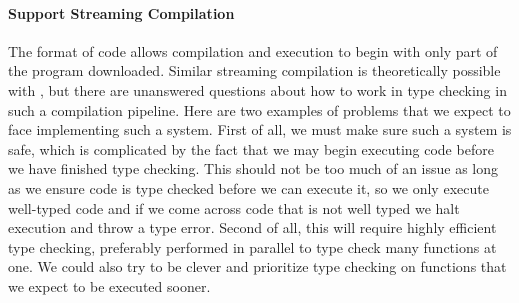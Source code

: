 \paragraph{Support Streaming Compilation}
The format of \wasm code allows compilation and execution to begin with only part of the program downloaded.
Similar streaming compilation is theoretically possible with \name, but there are unanswered questions about how to work in type checking in such a compilation pipeline.
Here are two examples of problems that we expect to face implementing such a system.
First of all, we must make sure such a system is safe, which is complicated by the fact that we may begin executing code before we have finished type checking.
This should not be too much of an issue as long as we ensure code is type checked before we can execute it, so we only execute well-typed code and if we come across code that is not well typed we halt execution and throw a type error.
Second of all, this will require highly efficient type checking, preferably performed in parallel to type check many functions at one.
We could also try to be clever and prioritize type checking on functions that we expect to be executed sooner.
